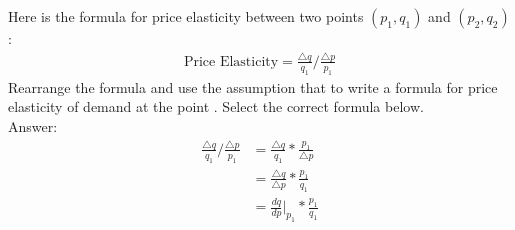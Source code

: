 \documentclass[10pt,a4paper]{article}
\author{Daniel Frederico Lins Leite}
\begin{document}
	Here is the formula for price elasticity between two points $(p_1,q_1)$  and $(p_2,q_2)$:
	\begin{align*}
		\text{Price Elasticity} = \frac{\triangle q}{q_1} / \frac{\triangle p}{p_1}
	\end{align*}		
	Rearrange the formula and use the assumption that  to write a formula for price elasticity of demand at the point . Select the correct formula below.				
	\\
	Answer:\\
	\begin{align*}
		 \frac{\triangle q}{q_1} / \frac{\triangle p}{p_1}  &= \frac{\triangle q}{q_1} * \frac{p_1}{\triangle p}\\
		 &= \frac{\triangle q}{\triangle p} * \frac{p_1}{q_1}\\
 		 &= \frac{dq}{dp}\big|_{p_1} * \frac{p_1}{q_1}
	\end{align*}			
\end{document}
